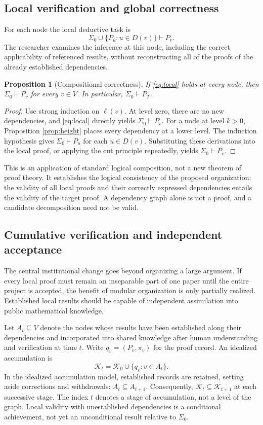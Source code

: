 \documentclass[11pt,a4paper]{article}
\newtheorem{proposition}{Proposition}
\theoremstyle{definition}\newtheorem{definition}{Definition}
\newcommand{\K}{\mathcal K}
\begin{document}
\subsection{Local verification and global correctness}
For each node the local deductive task is
\begin{equation}\label{eq:local}
 \Sigma_0\cup\{P_u:u\in D(v)\}\vdash P_v.
\end{equation}
The researcher examines the inference at this node, including the correct applicability of referenced results, without reconstructing all of the proofs of the already established dependencies.

\begin{proposition}[Compositional correctness]\label{prop:compose}
If \eqref{eq:local} holds at every node, then $\Sigma_0\vdash P_v$ for every $v\in V$. In particular, $\Sigma_0\vdash P_T$.
\end{proposition}
\begin{proof}
Use strong induction on $\ell(v)$. At level zero, there are no new dependencies, and \eqref{eq:local} directly yields $\Sigma_0\vdash P_v$. For a node at level $k>0$, Proposition \ref{prop:height} places every dependency at a lower level. The induction hypothesis gives $\Sigma_0\vdash P_u$ for each $u\in D(v)$. Substituting these derivations into the local proof, or applying the cut principle repeatedly, yields $\Sigma_0\vdash P_v$.
\end{proof}
This is an application of standard logical composition, not a new theorem of proof theory. It establishes the logical consistency of the proposed organization: the validity of all local proofs and their correctly expressed dependencies entails the validity of the target proof. A dependency graph alone is not a proof, and a candidate decomposition need not be valid.

\subsection{Cumulative verification and independent acceptance}
The central institutional change goes beyond organizing a large argument. If every local proof must remain an inseparable part of one paper until the entire project is accepted, the benefit of modular organization is only partially realized. Established local results should be capable of independent assimilation into public mathematical knowledge.

Let $A_t\subseteq V$ denote the nodes whose results have been established along their dependencies and incorporated into shared knowledge after human understanding and verification at time $t$. Write $q_v=(P_v,\pi_v)$ for the proof record. An idealized accumulation is
\begin{equation}\label{eq:library}
 \K_t=\K_0\cup\{q_v:v\in A_t\}.
\end{equation}
In the idealized accumulation model, established records are retained, setting aside corrections and withdrawals: $A_t\subseteq A_{t+1}$. Consequently, $\K_t\subseteq\K_{t+1}$ at each successive stage. The index $t$ denotes a stage of accumulation, not a level of the graph. Local validity with unestablished dependencies is a conditional achievement, not yet an unconditional result relative to $\Sigma_0$.
\end{document}
